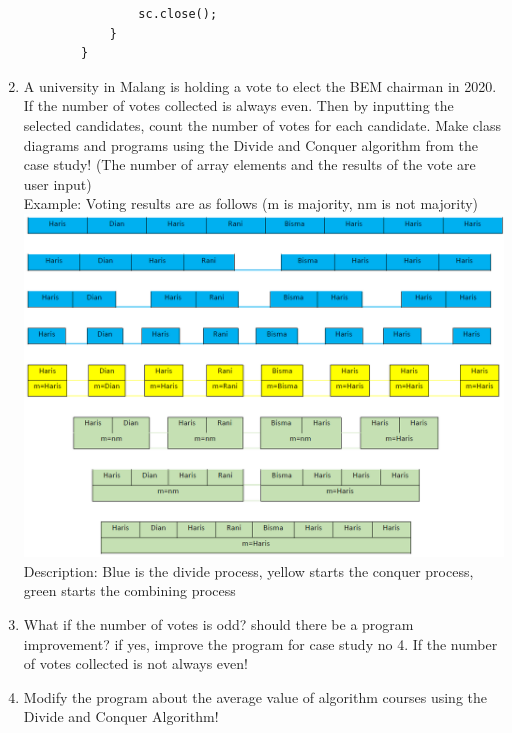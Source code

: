 \documentclass[12pt,titlepage]{article}
\begin{document}
\begin{enumerate}
\begin{verbatim}
                sc.close();
            }
        }
    \end{verbatim}
    \item A university in Malang is holding a vote to elect the BEM chairman in 2020. If the number of votes collected is always even. Then by inputting the selected candidates, count the number of votes for each candidate. Make class diagrams and programs using the Divide and Conquer algorithm from the case study! (The number of array elements and the results of the vote are user input) \mbox{}\\
    Example: Voting results are as follows (m is majority, nm is not majority)
    \includegraphics[width=14cm]{./images/figures/fig4.png}
    \mbox{}\\
    Description: Blue is the divide process, yellow starts the conquer process, green starts the combining process
    \item What if the number of votes is odd? should there be a program improvement? if yes, improve the program for case study no 4. If the number of votes collected is not always even!
    \item Modify the program about the average value of algorithm courses using the Divide and Conquer Algorithm!
\end{enumerate}
\end{document}

